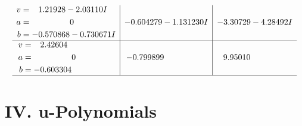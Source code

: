 \documentclass[1p]{elsarticle_modified}
\theoremstyle{definition}
\begin{document}
$$\begin{array}{c|c|c}
\begin{aligned}
v &= \phantom{-}1.21928 - 2.03110 I \\
a &= \phantom{-0.000000 } 0 \\
b &= -0.570868 - 0.730671 I\end{aligned}
 & -0.604279 - 1.131230 I & -3.30729 - 4.28492 I \\ \hline\begin{aligned}
v &= \phantom{-}2.42604\phantom{ +0.000000I} \\
a &= \phantom{-0.000000 } 0 \\
b &= -0.603304\phantom{ +0.000000I}\end{aligned}
 & -0.799899\phantom{ +0.000000I} & \phantom{-}9.95010\phantom{ +0.000000I}\\
 \hline 
 \end{array}$$\newpage
\newpage\renewcommand{\arraystretch}{1}
\centering \section*{ IV. u-Polynomials}
\end{document}
